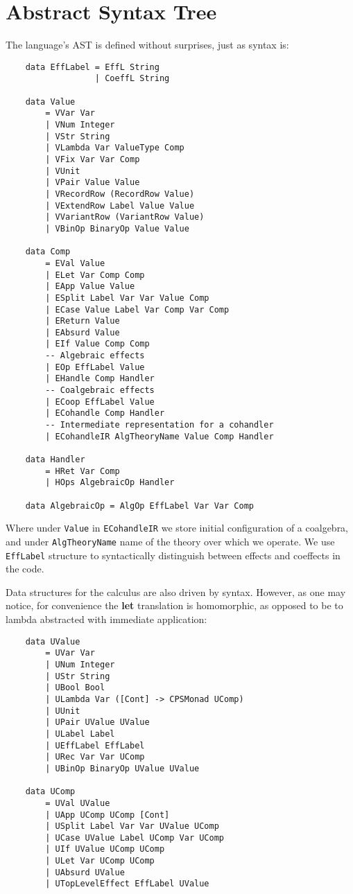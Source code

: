 \documentclass[declaration,shortabstract]{iithesis}
\theoremstyle{definition} \newtheorem{definition}{Definition}[chapter]
\theoremstyle{remark} \newtheorem{remark}[definition]{Observation}
\theoremstyle{plain} \newtheorem{theorem}[definition]{Theorem}
\theoremstyle{plain} \newtheorem{lemma}[definition]{Lemma}
\begin{document}
    \section{Abstract Syntax Tree}\label{sec:implementation-ast}

    The language's AST is defined without surprises, just as syntax is:

\begin{verbatim}
    data EffLabel = EffL String
                  | CoeffL String

    data Value
        = VVar Var
        | VNum Integer
        | VStr String
        | VLambda Var ValueType Comp
        | VFix Var Var Comp
        | VUnit
        | VPair Value Value
        | VRecordRow (RecordRow Value)
        | VExtendRow Label Value Value
        | VVariantRow (VariantRow Value)
        | VBinOp BinaryOp Value Value

    data Comp
        = EVal Value
        | ELet Var Comp Comp
        | EApp Value Value
        | ESplit Label Var Var Value Comp
        | ECase Value Label Var Comp Var Comp
        | EReturn Value
        | EAbsurd Value
        | EIf Value Comp Comp
        -- Algebraic effects
        | EOp EffLabel Value
        | EHandle Comp Handler
        -- Coalgebraic effects
        | ECoop EffLabel Value
        | ECohandle Comp Handler
        -- Intermediate representation for a cohandler
        | ECohandleIR AlgTheoryName Value Comp Handler

    data Handler
        = HRet Var Comp
        | HOps AlgebraicOp Handler

    data AlgebraicOp = AlgOp EffLabel Var Var Comp
\end{verbatim}

    \noindent
    Where under \verb!Value! in \verb!ECohandleIR! we store initial
    configuration of a coalgebra, and under \verb!AlgTheoryName! name of the
    theory over which we operate. We use \verb!EffLabel! structure to
    syntactically distinguish between effects and coeffects in the code.

    Data structures for the calculus are also driven by syntax. However, as one
    may notice, for convenience the \textbf{let} translation is homomorphic,
    as opposed to be to lambda abstracted with immediate application:

\begin{verbatim}
    data UValue
        = UVar Var
        | UNum Integer
        | UStr String
        | UBool Bool
        | ULambda Var ([Cont] -> CPSMonad UComp)
        | UUnit
        | UPair UValue UValue
        | ULabel Label
        | UEffLabel EffLabel
        | URec Var Var UComp
        | UBinOp BinaryOp UValue UValue

    data UComp
        = UVal UValue
        | UApp UComp UComp [Cont]
        | USplit Label Var Var UValue UComp
        | UCase UValue Label UComp Var UComp
        | UIf UValue UComp UComp
        | ULet Var UComp UComp
        | UAbsurd UValue
        | UTopLevelEffect EffLabel UValue
\end{verbatim}
\end{document}
